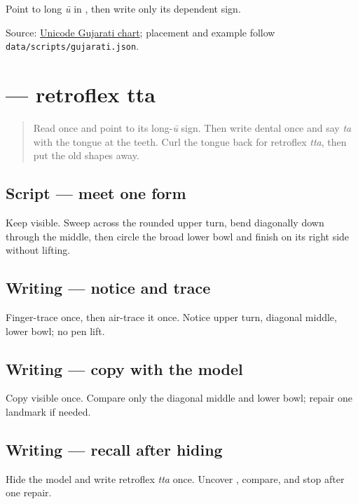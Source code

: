 \begin{tcolorbox}[breakable,colback=teal!4,colframe=teal!35!black,title={Before you move on}]
Point to long \emph{ū} in \textbf{ }, then write only its dependent sign.

Source: \href{https://www.unicode.org/charts/PDF/U0A80.pdf}{Unicode Gujarati chart}; placement and example follow \texttt{data/scripts/gujarati.json}.
\end{tcolorbox}
\section[\texorpdfstring{\gu{ટ} (ṭa)}{ટ (ṭa)}]{ — retroflex tta}

\label{lesson:GU-W07-tta}



\begin{quote}
Read \textbf{} once and point to its long-\emph{ū} sign. Then write dental \textbf{} once and say \emph{ta} with the tongue at the teeth. Curl the tongue back for retroflex \emph{tta}, then put the old shapes away.
\end{quote}

\subsection*{Script — meet one form}
Keep \textbf{} visible. Sweep across the rounded upper turn, bend diagonally down through the middle, then circle the broad lower bowl and finish on its right side without lifting.

\subsection*{Writing — notice and trace}

Finger-trace \textbf{} once, then air-trace it once. Notice upper turn, diagonal middle, lower bowl; no pen lift.

\subsection*{Writing — copy with the model}
Copy visible \textbf{} once. Compare only the diagonal middle and lower bowl; repair one landmark if needed.

\subsection*{Writing — recall after hiding}
Hide the model and write retroflex \emph{tta} once. Uncover \textbf{}, compare, and stop after one repair.

